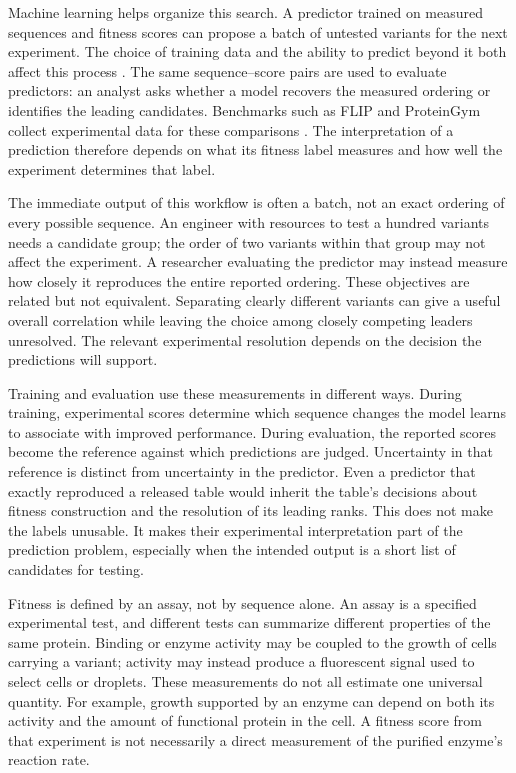 \documentclass[11pt]{article}
\begin{document}
Machine learning helps organize this search. A predictor trained on measured
sequences and fitness scores can propose a batch of untested variants for
the next experiment. The choice of training data and the ability to predict
beyond it both affect this process \citep{yang2019,wittmann2021}.
The same sequence--score pairs are used to evaluate predictors: an analyst
asks whether a model recovers the measured ordering or identifies the
leading candidates. Benchmarks such as FLIP and ProteinGym collect
experimental data for these comparisons \citep{dallago2021,notin2023}.
The interpretation of a prediction therefore depends on what its fitness
label measures and how well the experiment determines that label.

The immediate output of this workflow is often a batch, not an exact
ordering of every possible sequence. An engineer with resources to test
a hundred variants needs a candidate group; the order of two variants
within that group may not affect the experiment. A researcher evaluating
the predictor may instead measure how closely it reproduces the entire
reported ordering. These objectives are related but not equivalent.
Separating clearly different variants can give a useful overall
correlation while leaving the choice among closely competing leaders
unresolved. The relevant experimental resolution depends on the decision
the predictions will support.

Training and evaluation use these measurements in different ways. During
training, experimental scores determine which sequence changes the model
learns to associate with improved performance. During evaluation, the
reported scores become the reference against which predictions are judged.
Uncertainty in that reference is distinct from uncertainty in the predictor.
Even a predictor that exactly reproduced a released table would inherit
the table's decisions about fitness construction and the resolution of its
leading ranks. This does not make the labels unusable. It makes their
experimental interpretation part of the prediction problem, especially
when the intended output is a short list of candidates for testing.

Fitness is defined by an assay, not by sequence alone. An assay is a
specified experimental test, and different tests can summarize different
properties of the same protein. Binding or enzyme activity may be coupled
to the growth of cells carrying a variant; activity may instead produce
a fluorescent signal used to select cells or droplets. These measurements
do not all estimate one universal quantity. For example, growth supported
by an enzyme can depend on both its activity and the amount of functional
protein in the cell. A fitness score from that experiment is not necessarily
a direct measurement of the purified enzyme's reaction rate.
\end{document}
